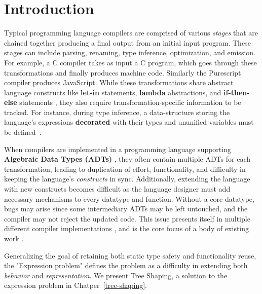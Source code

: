 \chapter{Introduction}
\label{chapter:Introduction}
\thispagestyle{myheadings}

    Typical programming language compilers are comprised of various \textit{stages} that are chained together producing a final output from an initial input program.
    These stages can include parsing, renaming, type inference, optimization, and emission.
    For example, a C compiler takes as input a C program, which goes through these transformations and finally produces machine code.
    Similarly the Purescript \cite{purescript} compiler produces JavaScript. While these transformations share abstract language constructs like \textbf{let-in} statements, \textbf{lambda} abstractions, and \textbf{if-then-else} statements \cite{Pierce2002-px}, they also require transformation-specific information to be tracked.
    For instance, during type inference, a data-structure storing the language's expressions \textbf{decorated} with their types and ununified variables must be defined~\cite{JavaCompilerDesign}. 

    When compilers are implemented in a programming language supporting \textbf{Algebraic Data Types (ADTs)} \cite{ADTs}, they often contain multiple ADTs for each transformation, leading to duplication of effort, functionality, and difficulty in keeping the language's \textit{constructs} in sync.
    Additionally, extending the language with new constructs becomes difficult as the language designer must add necessary mechanisms to every datatype and function.
    Without a core datatype, bugs may arise since some intermediary ADTs may be left untouched, and the compiler may not reject the updated code. This issue presents itself in multiple different compiler implementations \cite{GHC, ocaml}, and is the core focus of a body of existing work \cite{Torgersen2004, Axelsson, openfunctions}.

    Generalizing the goal of retaining both static type safety and functionality reuse, the "Expression problem" \cite{} defines the problem as a difficulty in extending both \textit{behavior} and \textit{representation}. We present Tree Shaping, a solution to the expression problem in Chatper~\ref{tree-shaping}.

